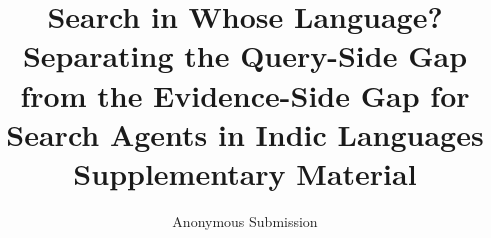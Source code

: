 \documentclass[10pt,letterpaper]{article}
\title{Search in Whose Language? Separating the Query-Side Gap from the Evidence-Side Gap for Search Agents in Indic Languages\\[4pt]\large Supplementary Material}
\author{Anonymous Submission}
\date{}
\begin{document}
\maketitle
\appendix
\renewcommand{\thesection}{\Alph{section}}



\end{document}
